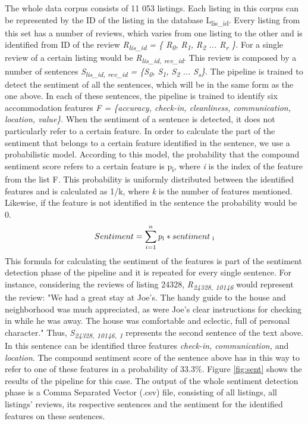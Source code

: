 The whole data corpus consists of 11 053 listings. Each listing in this corpus can be represented by the ID of the listing in the database L\textsubscript{lis\_id}. Every listing from this set has a number of reviews, which varies from one listing to the other and is identified from ID of the review \textit{R\textsubscript{lis\_id} = \{ R\textsubscript{0}, R\textsubscript{1},  R\textsubscript{2} ... R\textsubscript{r} \}}. For a single review of a certain listing would be \textit{R\textsubscript{lis\_id, rev\_id}}. This review is composed by a number of sentences \textit{S\textsubscript{lis\_id, rev\_id} = \{S\textsubscript{0}, S\textsubscript{1}, S\textsubscript{2} ... S\textsubscript{s}\}}. 
The pipeline is trained to detect the sentiment of all the sentences, which will be in the same form as the one above. 
In each of these sentences, the pipeline is trained to identify six accommodation features \textit{F = \{accuracy, check-in, cleanliness, communication, location, value\}}. When the sentiment of a sentence is detected, it does not particularly refer to a certain feature. In order to calculate the part of the sentiment that belongs to a certain feature identified in the sentence, we use a probabilistic model. According to this model, the probability that the compound sentiment score refers to a certain feature is p\textsubscript{i}, where \textit{i} is the index of the feature from the list F. This probability is uniformly distributed between the identified features and is calculated as 1/k, where \textit{k} is the number of features mentioned. Likewise, if the feature is not identified in the sentence the probability would be 0.
%
$$Sentiment = \sum_{i=1}^{n}p\textsubscript{i} *  sentiment\textsubscript{ i}$$ 
%
This formula for calculating the sentiment of the features is part of the sentiment detection phase of the pipeline and it is repeated for every single sentence. For instance, considering the reviews of listing 24328,  \textit{R\textsubscript{24328, 10146}} would represent the review: "We had a great stay at Joe's. The handy guide to the house and neighborhood was much appreciated, as were Joe's clear instructions for checking in while he was away. The house was comfortable and eclectic, full of personal character." Thus, \textit{S\textsubscript{24328, 10146, 1}} represents the second sentence of the text above. In this sentence can be identified three features \textit{check-in, communication,} and \textit{location}. The compound sentiment score of the sentence above has in this way to refer to one of these features in a probability of 33.3\%. Figure \ref{fig:sent} shows the results of the pipeline for this case. The output of the whole sentiment detection phase is a Comma Separated Vector (.csv) file, consisting of all listings, all listings' reviews, its respective sentences and the sentiment for the identified features on these sentences. 
